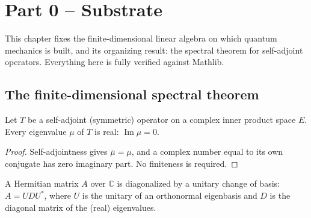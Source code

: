 %

\chapter{Part 0 -- Substrate}

This chapter fixes the finite-dimensional linear algebra on which quantum
mechanics is built, and its organizing result: the spectral theorem for
self-adjoint operators. Everything here is fully verified against Mathlib.

\section{The finite-dimensional spectral theorem}

\begin{theorem}
  \label{thm:selfadjoint-real}
  \leanok
  Let $T$ be a self-adjoint (symmetric) operator on a complex inner product
  space $E$. Every eigenvalue $\mu$ of $T$ is real: $\operatorname{Im} \mu = 0$.
\end{theorem}

\begin{proof}
  \leanok
  Self-adjointness gives $\overline{\mu} = \mu$, and a complex number equal to
  its own conjugate has zero imaginary part. No finiteness is required.
\end{proof}

\begin{theorem}
  \label{thm:hermitian-spectral}
  \leanok
  A Hermitian matrix $A$ over $\mathbb{C}$ is diagonalized by a unitary change of
  basis: $A = U D U^{*}$, where $U$ is the unitary of an orthonormal eigenbasis
  and $D$ is the diagonal matrix of the (real) eigenvalues.
\end{theorem}

